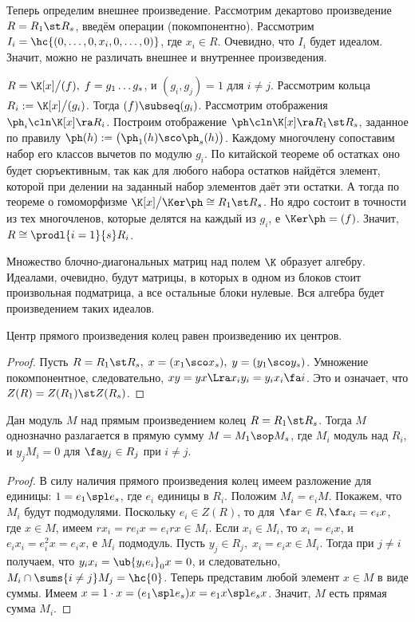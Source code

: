 \documentclass[a4paper]{article}
\begin{document}
Теперь определим внешнее произведение. Рассмотрим декартово произведение $R = R_1 \st R_s$, введём  операции
(покомпонентно). Рассмотрим $I_i = \hc{(0,\ldots,0,x_i,0,\ldots,0)}$, где $x_i \in R$. Очевидно, что $I_i$
будет идеалом. Значит, можно не различать внешнее и внутреннее произведения.

\begin{ex}
$R=\K[x]\bigl/(f), \; f=g_1 \ldots g_s$, и $(g_i,g_j)=1$ для $i \neq j$. Рассмотрим кольца  $R_i :=
\K[x]\bigl/(g_i)$. Тогда $(f) \subseq (g_i)$. Рассмотрим отображения $\ph_i\cln \K[x] \ra R_i$. Построим
отображение $\ph\cln \K[x]\ra R_1 \st R_s$, заданное по правилу $\ph(h):=\bigl(\ph_1(h) \sco \ph_s(h)\bigr)$.
Каждому многочлену сопоставим набор его классов вычетов по модулю $g_i$. По китайской теореме об остатках оно
будет сюръективным, так как для любого набора остатков найдётся элемент, которой при делении на заданный
набор элементов даёт эти остатки. А тогда по теореме о гомоморфизме $\K[x]\bigl/\Ker \ph \cong R_1 \st R_s$.
Но ядро состоит в точности из тех многочленов, которые делятся на каждый из $g_i$, е $\Ker \ph = (f)$.
Значит, $R \cong \prodl{i=1}{s} R_i$.
\end{ex}

\begin{ex}
Множество блочно-диагональных матриц над полем $\K$ образует алгебру. Идеалами, очевидно, будут  матрицы, в
которых в одном из блоков стоит произвольная подматрица, а все остальные блоки нулевые. Вся алгебра будет
произведением таких идеалов.
\end{ex}

\begin{stm}
Центр прямого произведения колец равен произведению их центров.
\end{stm}
\begin{proof}
Пусть $R=R_1 \st R_s, \; x=(x_1 \sco x_s), \; y = (y_1 \sco y_s)$. Умножение покомпонентное,
следовательно, $xy=yx \Lra x_i y_i = y_i x_i \fa i$. Это и означает, что $Z(R)=Z(R_1) \st Z(R_s)$.
\end{proof}

\begin{stm}
Дан модуль $M$ над прямым произведением колец $R = R_1 \st R_s$. Тогда $M$ однозначно разлагается в прямую сумму
$M=M_1 \sop M_s$, где $M_i$ модуль над $R_i$, и $y_jM_i = 0$ для $\fa y_j \in R_j$ при $i \neq j$.
\end{stm}
\begin{proof}
В силу наличия прямого произведения колец имеем разложение для единицы: $1=e_1  \spl  e_s$, где $e_i$ единицы в $R_i$. Положим
$M_i = e_i M$. Покажем, что $M_i$ будут подмодулями. Поскольку $e_i \in Z(R)$, то для $\fa r \in R, \fa x_i = e_i x$, где $x \in M$, имеем
$rx_i=re_i x=e_irx \in M_i$. Если $x_i \in M_i$, то $x_i = e_i x$, и $e_ix_i=e_i^2x=e_ix$, е $M_i$ подмодуль. Пусть
$y_j \in R_j, \; x_i=e_ix \in M_i$. Тогда при $j \neq i$ получаем, что $y_ix_i = \ub{y_ie_i}_0 x=0$, и следовательно,
$M_i \cap \sums{i\neq j}M_j = \hc{0}$. Теперь представим любой элемент $x \in M$ в виде суммы.
Имеем $x=1\cdot x = (e_1  \spl  e_s)x =e_1x \spl  e_s x$. Значит, $M$ есть прямая сумма $M_i$.
\end{proof}
\end{document}
